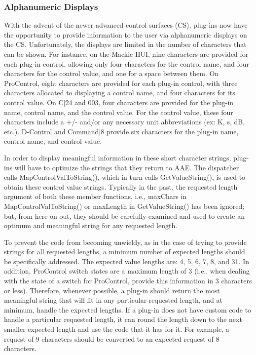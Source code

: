 \hypertarget{a00363_subsection_alphanumeric_displays}{}\subsubsection{Alphanumeric Displays}\label{a00363_subsection_alphanumeric_displays}
With the advent of the newer advanced control surfaces (C\+S), plug-\/ins now have the opportunity to provide information to the user via alphanumeric displays on the C\+S. Unfortunately, the displays are limited in the number of characters that can be shown. For instance, on the Mackie H\+U\+I, nine characters are provided for each plug-\/in control, allowing only four characters for the control name, and four characters for the control value, and one for a space between them. On Pro\+Control, eight characters are provided for each plug-\/in control, with three characters allocated to displaying a control name, and four characters for its control value. On C$\vert$24 and 003, four characters are provided for the plug-\/in name, control name, and the control value. For the control value, these four characters include a +/-\/ and/or any necessary unit abbreviations (ex\+: K, s, d\+B, etc.). D-\/\+Control and Command$\vert$8 provide six characters for the plug-\/in name, control name, and control value.

In order to display meaningful information in these short character strings, plug-\/ins will have to optimize the strings that they return to A\+A\+E. The dispatcher calls Map\+Control\+Val\+To\+String(), which in turn calls Get\+Value\+String(), is used to obtain these control value strings. Typically in the past, the requested length argument of both these member functions, i.\+e., max\+Chars in Map\+Control\+Val\+To\+String() or max\+Length in Get\+Value\+String() has been ignored; but, from here on out, they should be carefully examined and used to create an optimum and meaningful string for any requested length.

To prevent the code from becoming unwieldy, as in the case of trying to provide strings for all requested lengths, a minimum number of expected lengths should be specifically addressed. The expected value lengths are\+: 4, 5, 6, 7, 8, and 31. In addition, Pro\+Control switch states are a maximum length of 3 (i.\+e., when dealing with the state of a switch for Pro\+Control, provide this information in 3 characters or less). Therefore, whenever possible, a plug-\/in should return the most meaningful string that will fit in any particular requested length, and at minimum, handle the expected lengths. If a plug-\/in does not have custom code to handle a particular requested length, it can round the length down to the next smaller expected length and use the code that it has for it. For example, a request of 9 characters should be converted to an expected request of 8 characters.

